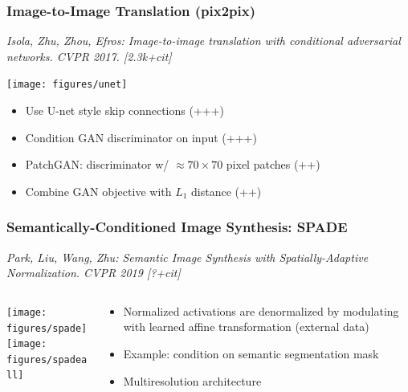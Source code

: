 \documentclass[compress]{beamer}
\newcommand{\is}[1]{\setlength{\itemsep}{#1}}
\begin{document}
\begin{frame} \frametitle{Image-to-Image Translation (pix2pix)}
{\small \textit{Isola, Zhu, Zhou, Efros: Image-to-image translation with conditional adversarial networks. CVPR 2017. [2.3k+cit]}}\\[1mm]

\begin{center}
\texttt{[image: figures/unet]}
\end{center}

\begin{itemize}\is{2mm}
\item Use U-net style skip connections (+++)\\[3mm]
\item Condition GAN discriminator on input (+++)
\item PatchGAN: discriminator w/ $\approx 70 \times 70$ pixel patches (++)
\item Combine GAN objective with $L_1$ distance (++)
\end{itemize}
\end{frame}

\begin{frame} \frametitle{Semantically-Conditioned Image Synthesis: SPADE}
{\small \textit{Park, Liu, Wang, Zhu: Semantic Image Synthesis with Spatially-Adaptive Normalization. CVPR 2019 [?+cit]}}\\[1mm]

\begin{columns}
\begin{column}{0.4\textwidth}
\begin{center}
\texttt{[image: figures/spade]}\\[3mm]
\texttt{[image: figures/spadeall]}
\end{center}
\end{column}
\begin{column}{0.599\textwidth}
\begin{itemize}\is{2mm}
\item Normalized activations are denormalized by modulating with learned affine transformation (external data)
\item Example: condition on semantic segmentation mask
\item Multiresolution architecture 
\end{itemize}
\end{column}
\end{columns}
\end{frame}
\end{document}

